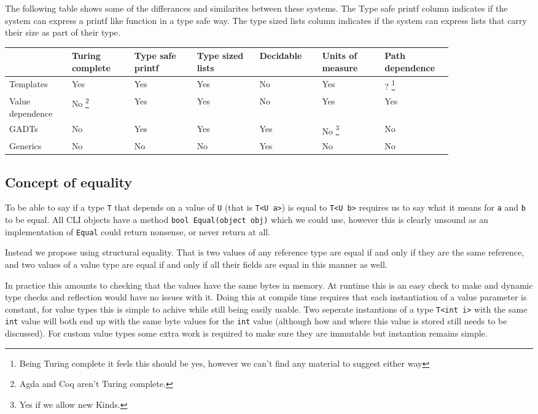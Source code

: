 \documentclass[english]{report}
\begin{document}
The following table shows some of the differances and similarites
between these systems. The Type safe printf column indicates if the
system can express a printf like function in a type safe way. The
type sized lists column indicates if the system can express lists
that carry their size as part of their type.

\begin{center}
\begin{longtable}{|>{\centering}p{0.12\linewidth}|>{\centering}p{0.12\linewidth}|>{\centering}p{0.12\linewidth}|>{\centering}p{0.12\linewidth}|>{\centering}p{0.12\linewidth}|>{\centering}p{0.12\linewidth}|>{\centering}p{0.12\linewidth}|}
\cline{2-7} 
\multicolumn{1}{>{\centering}p{0.12\linewidth}|}{} & Turing complete & Type safe printf & Type sized lists & Decidable & Units of measure & Path dependence\tabularnewline
\hline 
Templates & Yes & Yes & Yes & No & Yes & ?%
\footnote{Being Turing complete it feels this should be yes, however we can't
find any material to suggest either way%
}\tabularnewline
\hline 
Value dependence & No%
\footnote{Agda and Coq aren't Turing complete.%
} & Yes & Yes & No & Yes & Yes\tabularnewline
\hline 
GADTs & No & Yes & Yes & Yes & No%
\footnote{Yes if we allow new Kinds\cite{gadtsext}.%
} & No\tabularnewline
\hline 
Generics & No & No & No & Yes & No & No\tabularnewline
\hline 
\end{longtable}
\par\end{center}


\subsection{Concept of equality}

To be able to say if a type \texttt{T} that depends on a value of
\texttt{U} (that is \texttt{T<U a>}) is equal to \texttt{T<U b>} requires
us to say what it means for \texttt{a} and \texttt{b} to be equal.
All CLI objects have a method \texttt{bool Equal(object obj)} which
we could use, however this is clearly unsound as an implementation
of \texttt{Equal} could return nonsense, or never return at all.

Instead we propose using structural equality. That is
two values of any reference type are equal if and only if they are
the same reference, and two values of a value type are equal if and
only if all their fields are equal in this manner as well. 

In practice this amounts to checking that the values have the same bytes in memory.
At runtime this is an easy check to make and dynamic type checks and reflection would have
no issues with it. Doing this at compile time requires that each instantiation of a value 
parameter is constant, for value types this is simple to achive while still being easily usable.
Two seperate instantions of a type \texttt{T<int i>} with the same \texttt{int} value will both end 
up with the same byte values for the \texttt{int} value (although how and where this value is stored 
still needs to be discussed). For custom value types some extra work is required to make sure they are
immutable but instantion remains simple. 
\end{document}
